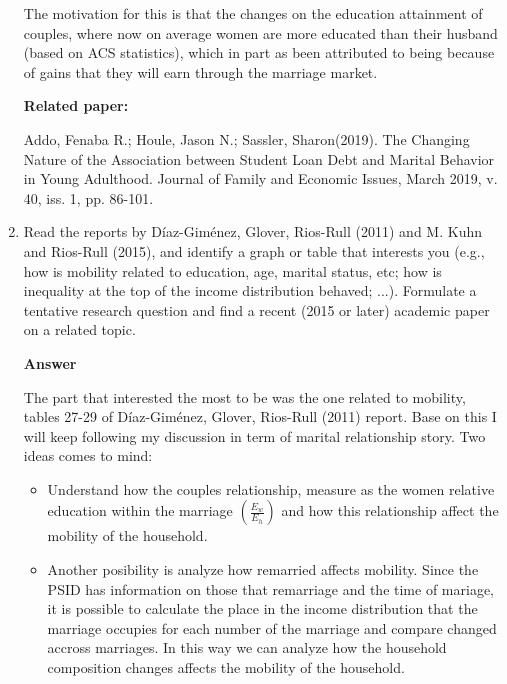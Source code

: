 \documentclass[12pt]{article}%
\begin{document}
\begin{enumerate}
	The motivation for this is that the changes on the education attainment of couples, where now on average women are more educated than their husband (based on ACS statistics), which in part as been attributed to being because of gains that they will earn through the marriage market. 
	
	\textbf{Related paper:}
	
	Addo, Fenaba R.; Houle, Jason N.; Sassler, Sharon(2019). The Changing Nature of the Association between Student Loan Debt and Marital Behavior in Young Adulthood. 
	Journal of Family and Economic Issues, March 2019, v. 40, iss. 1, pp. 86-101.
	
	\item Read the reports by Díaz-Giménez, Glover, Rios-Rull (2011) and M. Kuhn and Rios-Rull (2015), and identify a graph or table that interests you
	(e.g., how is mobility related to education, age, marital status, etc; how is inequality at the top of the income distribution behaved; ...). Formulate a tentative research question and find a recent (2015 or later) academic  paper on a related topic.
	
		    	\vspace{3mm}
	
	{\bf Answer}   	
	
	\vspace{3mm}
	
	The part that interested the most to be was the one related to mobility, tables 27-29 of Díaz-Giménez, Glover, Rios-Rull (2011) report. Base on this I will keep following my discussion in term of marital relationship story. Two ideas comes to mind:
	
 \begin{itemize}
 	\item Understand how the couples relationship, measure as the women relative education within the marriage $\left( \frac{E_w}{E_h}\right) $ and how this relationship affect the mobility of the household. 
 	
 	\item Another posibility is analyze how remarried affects mobility. Since the PSID has information on those that remarriage and the time of mariage, it is possible to calculate the place in the income distribution that the marriage occupies for each number of the marriage and compare changed accross marriages. In this way we can analyze how the household composition changes affects the mobility of the household.
 	
 \end{itemize}


\end{enumerate}
\end{document}
